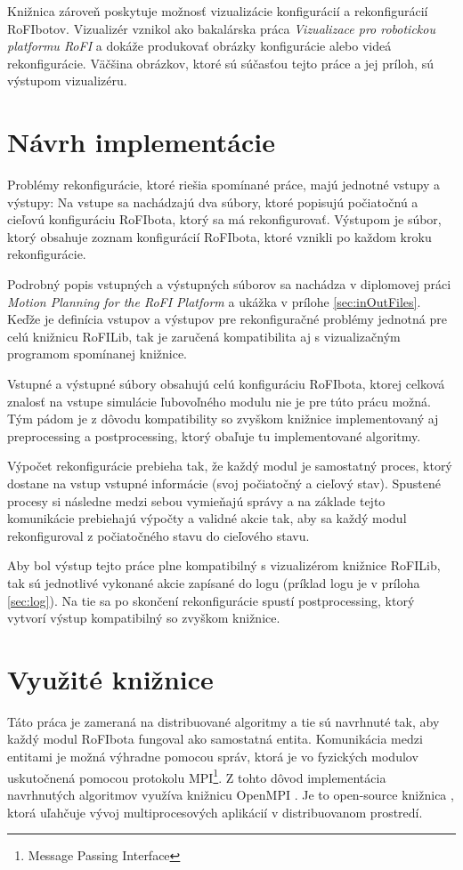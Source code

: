 \documentclass[
  digital, %
  oneside, %
  notable,   %
  lof,     %
  nolot,     %
]{fithesis3}
\begin{document}
Knižnica zároveň poskytuje možnosť vizualizácie konfigurácií a rekonfigurácií RoFIbotov. Vizualizér vznikol ako bakalárska práca \textit{Vizualizace pro robotickou platformu RoFI} \cite{nausovaBachelorThesis} a dokáže produkovať obrázky konfigurácie alebo videá rekonfigurácie. Väčšina obrázkov, ktoré sú súčasťou tejto práce a jej príloh, sú výstupom vizualizéru. 

\section{Návrh implementácie}
Problémy rekonfigurácie, ktoré riešia spomínané práce, majú jednotné vstupy a výstupy: Na vstupe sa nachádzajú dva súbory, ktoré popisujú počiatočnú a cieľovú konfiguráciu RoFIbota, ktorý sa má rekonfigurovať. Výstupom je súbor, ktorý obsahuje zoznam konfigurácií RoFIbota, ktoré vznikli po každom kroku rekonfigurácie. 

Podrobný popis vstupných a výstupných súborov sa nachádza v diplomovej práci \textit{Motion Planning for the RoFI Platform} \cite{vozarovaMasterThesis} a ukážka v prílohe \ref{sec:inOutFiles}. Keďže je definícia vstupov a výstupov pre rekonfiguračné problémy jednotná pre celú knižnicu RoFILib, tak je zaručená kompatibilita aj s vizualizačným programom spomínanej knižnice. 

Vstupné a výstupné súbory obsahujú celú konfiguráciu RoFIbota, ktorej celková znalosť na vstupe simulácie ľubovoľného modulu nie je pre túto prácu možná. Tým pádom je z dôvodu kompatibility so zvyškom knižnice implementovaný aj preprocessing a postprocessing, ktorý obaľuje tu implementované algoritmy. 

Výpočet rekonfigurácie prebieha tak, že každý modul je samostatný proces, ktorý dostane na vstup vstupné informácie (svoj počiatočný a cieľový stav). Spustené procesy si následne medzi sebou vymieňajú správy a na základe tejto komunikácie prebiehajú výpočty a validné akcie tak, aby sa každý modul rekonfiguroval z počiatočného stavu do cieľového stavu. 

Aby bol výstup tejto práce plne kompatibilný s vizualizérom knižnice RoFILib, tak sú jednotlivé vykonané akcie zapísané do logu (príklad logu je v príloha \ref{sec:log}). Na tie sa po skončení rekonfigurácie spustí postprocessing, ktorý vytvorí výstup kompatibilný so zvyškom knižnice. 

\section{Využité knižnice}
\label{sec:libraries}
Táto práca je zameraná na distribuované algoritmy a tie sú navrhnuté tak, aby každý modul RoFIbota fungoval ako samostatná entita. Komunikácia medzi entitami je možná výhradne pomocou správ, ktorá je vo fyzických modulov uskutočnená pomocou protokolu MPI\footnote{Message Passing Interface}. Z tohto dôvod implementácia navrhnutých algoritmov využíva knižnicu OpenMPI \cite{openMPILibrary}. Je to open-source knižnica \cite{openMPIGit}, ktorá uľahčuje vývoj multiprocesových aplikácií v distribuovanom prostredí. 
\end{document}
